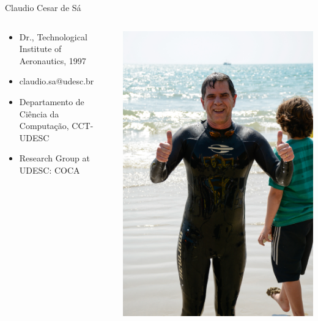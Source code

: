 \documentclass{beamer}
\begin{document}
\begin{frame}{Claudio Cesar de Sá}

\begin{columns} %
  \begin{column}{0.5\textwidth} %
   \begin{itemize}
    \item Dr., Technological Institute of Aeronautics, 1997
    \item claudio.sa@udesc.br
    \item Departamento de Ciência da Computação, CCT- UDESC
    \item Research Group at UDESC: COCA 
    \end{itemize}
  \end{column}
   \begin{column}{0.5\textwidth}  %
   \includegraphics[scale=0.28,keepaspectratio]{images/maratona01.jpg}
  \end{column} %
 \end{columns}
 
\end{frame}
\end{document}
